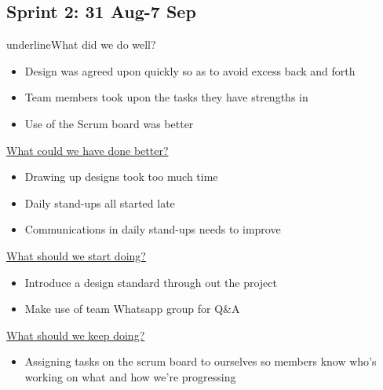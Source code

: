 \documentclass[12pt]{article}
\begin{document}
\subsection{Sprint 2: 31 Aug-7 Sep}
underline{What did we do well?}
\begin{itemize}
\item Design was agreed upon quickly so as to avoid excess back and forth
\item Team members took upon the tasks they have strengths in
\item Use of the Scrum board was better
\end{itemize}
\underline{What could we have done better?}
\begin{itemize}
\item Drawing up designs took too much time
\item Daily stand-ups all started late
\item Communications in daily stand-ups needs to improve
\end{itemize}
\underline{What should we start doing?}
\begin{itemize}
\item Introduce a design standard through out the project
\item Make use of team Whatsapp group for Q\&A
\end{itemize}
\underline{What should we keep doing?}
\begin{itemize}
\item Assigning tasks on the scrum board to ourselves so members know who's working on what and how we're progressing 
\end{itemize}
\end{document}

